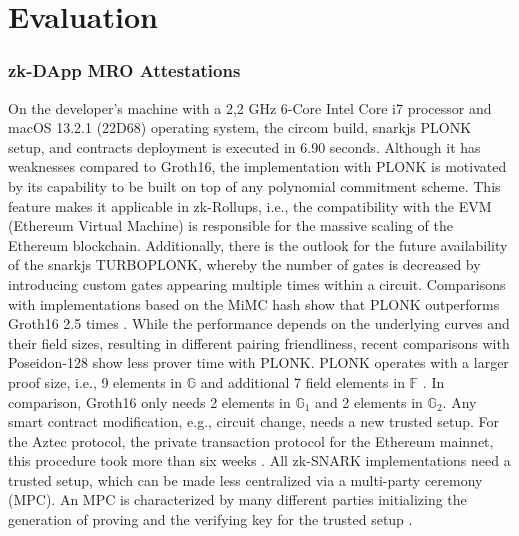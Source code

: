 \section{Evaluation}

\subsubsection{zk-DApp MRO Attestations}
On the developer's machine with a 2,2 GHz 6-Core Intel Core i7 processor and macOS 13.2.1 (22D68) operating system, the circom build, snarkjs PLONK setup, and contracts deployment is executed in 6.90 seconds. Although it has weaknesses compared to Groth16, the implementation with PLONK is motivated by its capability to be built on top of any polynomial commitment scheme. This feature makes it applicable in zk-Rollups, i.e., the compatibility with the EVM (Ethereum Virtual Machine) is responsible for the massive scaling of the Ethereum blockchain. Additionally, there is the outlook for the future availability of the snarkjs TURBOPLONK, whereby the number of gates is decreased by introducing custom gates appearing multiple times within a circuit. Comparisons with implementations based on the MiMC hash show that PLONK outperforms Groth16 2.5 times \citep{turboplonk}. While the performance depends on the underlying curves and their field sizes, resulting in different pairing friendliness, recent comparisons with Poseidon-128 show less prover time with PLONK. PLONK operates with a larger proof size, i.e., 9 elements in \begin{math} \mathbb{G}\end{math} and additional 7 field elements in \begin{math} \mathbb{F}\end{math} \citep{PLONKcryptoeprint:2019/953}. In comparison, Groth16 only needs 2 elements in \begin{math} \mathbb{G}_1\end{math} and 2 elements in \begin{math} \mathbb{G}_2\end{math}. Any smart contract modification, e.g., circuit change, needs a new trusted setup. For the Aztec protocol, the private transaction protocol for the Ethereum mainnet, this procedure took more than six weeks \citep{turboplonk}. All zk-SNARK implementations need a trusted setup, which can be made less centralized via a multi-party ceremony (MPC). An MPC is characterized by many different parties initializing the generation of proving and the verifying key for the trusted setup \citep{Thaler}. 

